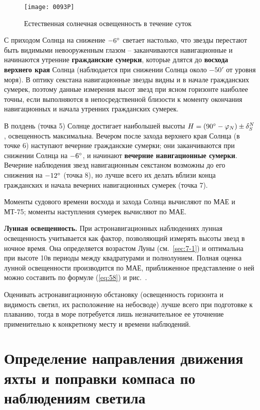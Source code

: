 \begin{figure*}[!htb]
  \centering
  \texttt{[image: 0093P]}
  \caption{Естественная солнечная освещенность в течение суток}
  \label{fig:93}
\end{figure*}

С приходом Солнца на снижение $-6^\circ$ светает настолько, что звезды
перестают быть видимыми невооруженным глазом \--- заканчиваются
навигационные и начинаются утренние \textbf{гражданские сумерки}, которые
длятся до \textbf{восхода верхнего края} Солнца (наблюдается при снижении
Солнца около $-50'$ от уровня моря). В оптику секстана навигационные
звезды видны и в начале гражданских сумерек, поэтому данные измерения
высот звезд при ясном горизонте наиболее точны, если выполняются в
непосредственной близости к моменту окончания навигационных и начала
утренних гражданских сумерек.

В полдень (точка 5) Солнце достигает наибольшей высоты
$H = (90^\circ - \varphi_N) \pm \delta^N_S$, освещенность
максимальна. Вечером после захода верхнего края Солнца (в точке 6)
наступают вечерние гражданские сумерки; они заканчиваются при снижении
Солнца на $-6^\circ$, и начинают \textbf{вечерние навигационные сумерки}. Вечерние
наблюдения звезд навигационным секстаном возможны до его снижения на
$-12^\circ$ (точка 8), но лучше всего их делать вблизи конца гражданских
и начала вечерних навигационных сумерек (точка 7).

Моменты судового времени восхода и захода Солнца вычисляют по МАЕ и
МТ-75; моменты наступления сумерек вычисляют по МАЕ.

\textbf{Лунная освещенность.} При астронавигационных наблюдениях
лунная освещенность учитывается как фактор, позволяющий измерять
высоты звезд в ночное время. Она определяется возрастом Луны
(см.~\ref{sec:7-1}) и оптимальна при высоте 10\gr в периоды
между квадратурами и полнолунием. Полная оценка лунной освещенности
производится по МАЕ, приближенное представление о ней можно составить
по формуле (\ref{eq:58}) и рис.~.

Оценивать астронавигационную обстановку (освещенность горизонта и
видимость светил, их расположение на небосводе) лучше всего при
подготовке к плаванию, тогда в море потребуется лишь незначительное ее
уточнение применительно к конкретному месту и времени наблюдений.

\section{Определение направления движения яхты и поправки компаса по наблюдениям светила\label{sec:7-4}}

